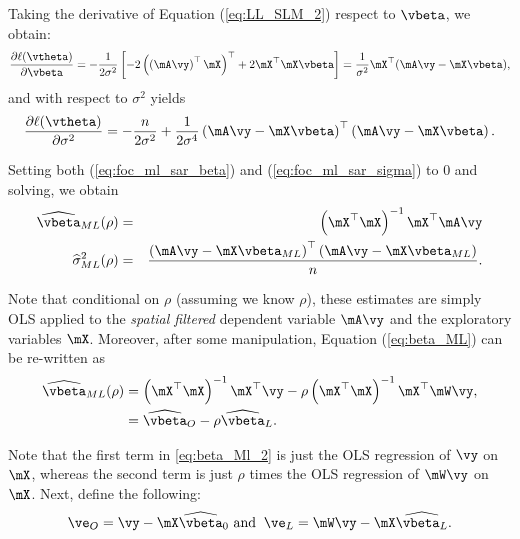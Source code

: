 \documentclass[english,12pt]{book}\usepackage[]{graphicx}\usepackage[]{xcolor}
\begin{document}
Taking the derivative of Equation (\ref{eq:LL_SLM_2}) respect to $\vbeta$, we obtain:
\begin{equation}\label{eq:foc_ml_sar_beta}
\frac{\partial \ell(\vtheta)}{\partial \vbeta} = -\frac{1}{2\sigma^2}\left[-2\left(\left(\mA\vy\right)^\top\mX\right)^\top + 2 \mX^\top\mX\vbeta\right] = \frac{1}{\sigma^2}\mX^\top(\mA\vy - \mX\vbeta),
\end{equation}
%
and with respect to $\sigma^2$ yields
\begin{equation}\label{eq:foc_ml_sar_sigma}
\frac{\partial \ell(\vtheta)}{\partial \sigma^2} = -\frac{n}{2\sigma^2} + \frac{1}{2\sigma^4}\left(\mA\vy - \mX\vbeta\right)^\top\left(\mA\vy - \mX\vbeta\right).
\end{equation}

Setting both (\ref{eq:foc_ml_sar_beta}) and (\ref{eq:foc_ml_sar_sigma}) to 0 and solving, we obtain
\begin{eqnarray}
	\widehat{\vbeta}_{ML}(\rho) &=& \left(\mX^\top\mX\right)^{-1}\mX^\top\mA\vy \label{eq:beta_ML} \\
	\widehat{\sigma}^2_{ML}(\rho) &=& \frac{\left(\mA\vy - \mX\vbeta_{ML}\right)^\top\left(\mA\vy - \mX\vbeta_{ML}\right)}{n}\label{eq:sigma_ML}.
\end{eqnarray}

Note that conditional on $\rho$ (assuming we know $\rho$), these estimates are simply OLS applied to the \emph{spatial filtered} dependent variable $\mA\vy$ and the exploratory variables $\mX$. Moreover, after some manipulation, Equation (\ref{eq:beta_ML}) can be re-written as
\begin{equation}\label{eq:beta_Ml_2}
\begin{aligned}
\widehat{\vbeta}_{ML}(\rho) &= \left(\mX^\top\mX\right)^{-1}\mX^\top\vy - \rho\left(\mX^\top\mX\right)^{-1}\mX^\top\mW\vy, \\
&= \widehat{\vbeta}_O -\rho \widehat{\vbeta}_L.
\end{aligned}
\end{equation}

Note that the first term in \eqref{eq:beta_Ml_2} is just the OLS regression of $\vy$ on $\mX$, whereas the second term is just $\rho$ times the OLS regression of $\mW\vy$ on $\mX$. Next, define the following:
\begin{equation}\label{eq:SLM_aux_residuals}
\ve_O = \vy - \mX\widehat{\vbeta}_0\,\,\mbox{and} \;\; \ve_L = \mW\vy - \mX\widehat{\vbeta_L}.
\end{equation}
\end{document}
